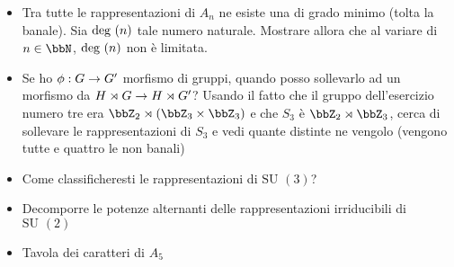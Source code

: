 \documentclass[a4paper,NoNotes,GeneralMath]{stdmdoc}
\newcommand{\SU}{\text{SU }}
\begin{document}
\begin{itemize}
		\item Tra tutte le rappresentazioni di $A_n$ ne esiste una di grado minimo (tolta la banale). Sia $\mbox{deg }(n)$ tale numero naturale. Mostrare allora che al variare di $n \in \bbN$, $\mbox{deg }(n)$ non è limitata.
		\item Se ho $\phi: G \rightarrow G'$ morfismo di gruppi, quando posso sollevarlo ad un morfismo da $H \rtimes G \rightarrow H \rtimes G'$? Usando il fatto che il gruppo dell'esercizio numero tre era $\bbZ_2 \rtimes (\bbZ_3 \times \bbZ_3)$ e che $S_3$ è $\bbZ_2 \rtimes \bbZ_3$, cerca di sollevare le rappresentazioni di $S_3$ e vedi quante distinte ne vengolo (vengono tutte e quattro le non banali)
		\item Come classificheresti le rappresentazioni di $\SU(3)$?
		\item Decomporre le potenze alternanti delle rappresentazioni irriducibili di $\SU(2)$
		\item Tavola dei caratteri di $A_5$
	\end{itemize}
\end{document}
